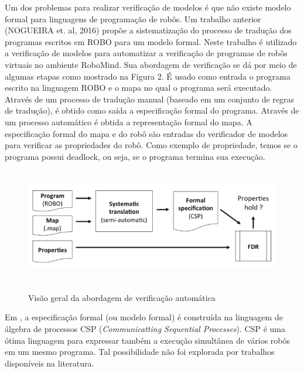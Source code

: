Um dos problemas para realizar verificação de modelos é que não existe modelo formal para linguagens de programação de robôs. Um trabalho anterior (NOGUEIRA et. al, 2016) propõe a sistematização do processo de tradução dos programas escritos em ROBO para um modelo formal.  Neste trabalho é utilizado a verificação de modelos para automatizar a verificação de programas de robôs virtuais no ambiente RoboMind. Sua abordagem de verificação se dá por meio de algumas etapas como mostrado na Figura 2. É usado como entrada o programa escrito na linguagem ROBO e o mapa no qual o programa será executado. Através de um processo de tradução manual (baseado em um conjunto de regras de tradução), é obtido como saída a especificação formal do programa. Através de um processo automático é obtida a representação formal do mapa. A especificação formal do mapa e do robô são entradas do verificador de modelos para verificar as propriedades do robô. Como exemplo de propriedade, temos se o programa possui deadlock, ou seja, se o programa termina sua execução. 

\begin{figure}[h]
\centering
\caption{Visão geral da abordagem de verificação automática}
\includegraphics[height=5cm]{figuras/approach_workflow.png}
\label{fig:fluxograma}
\end{figure} 

Em \cite{nogueira}, a especificação formal (ou modelo formal) é construída na linguagem de álgebra de processos CSP (\textit{Communicatting Sequential Processes}). CSP é uma ótima linguagem para expressar também a execução simultânea de vários robôs em um mesmo programa. Tal possibilidade não foi explorada por trabalhos disponíveis na literatura.

